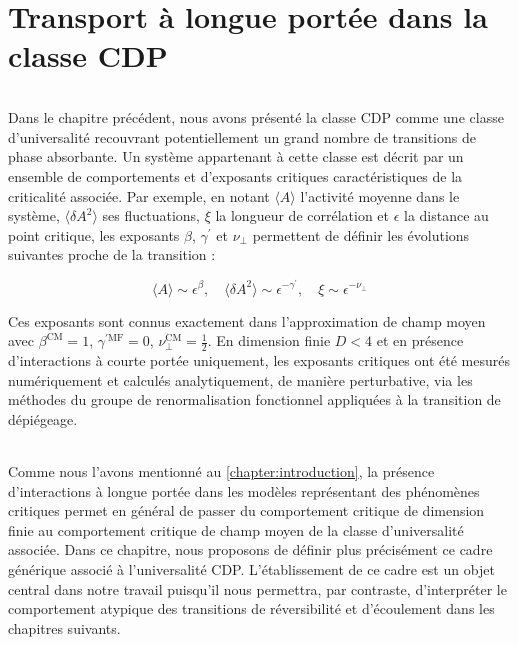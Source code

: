 \chapter{Transport à longue portée dans la classe CDP}

\label{chapter:TransportLP}

\subparagraph{}Dans le chapitre précédent, nous avons présenté la classe CDP comme une classe d'universalité recouvrant potentiellement un grand nombre de transitions de phase absorbante. Un système appartenant à cette classe est décrit par un ensemble de comportements et d'exposants critiques caractéristiques de la criticalité associée. Par exemple, en notant $\langle A \rangle$ l'activité moyenne dans le système, $\langle \delta A^2 \rangle$ ses fluctuations, $\xi$ la longueur de corrélation et $\epsilon$ la distance au point critique, les exposants $\beta$, $\gamma^\prime$ et $\nu_\perp$ permettent de définir les évolutions suivantes proche de la transition :

\begin{equation}
	\langle A \rangle \sim \epsilon^\beta, \quad \langle \delta A^2 \rangle \sim \epsilon^{-\gamma^\prime}, \quad \xi \sim \epsilon^{-\nu_\perp}
\end{equation}

\noindent Ces exposants sont connus exactement dans l'approximation de champ moyen avec $\beta^\text{CM} = 1$, $\gamma^{\prime\text{MF}} = 0$, $\nu_\perp^\text{CM} = \frac{1}{2}$. En dimension finie $D<4$ et en présence d'interactions à courte portée uniquement, les exposants critiques ont été mesurés numériquement \cite{lubeck_universal_2004} et calculés analytiquement, de manière perturbative, via les méthodes du groupe de renormalisation fonctionnel appliquées à la transition de dépiégeage.

\subparagraph{}Comme nous l'avons mentionné au \autoref{chapter:introduction}, la présence d'interactions à longue portée dans les modèles représentant des phénomènes critiques permet en général de passer du comportement critique de dimension finie au comportement critique de champ moyen de la classe d'universalité associée. Dans ce chapitre, nous proposons de définir plus précisément ce cadre générique associé à l'universalité CDP. L'établissement de ce cadre est un objet central dans notre travail puisqu'il nous permettra, par contraste, d'interpréter le comportement atypique des transitions de réversibilité et d'écoulement dans les chapitres suivants.

